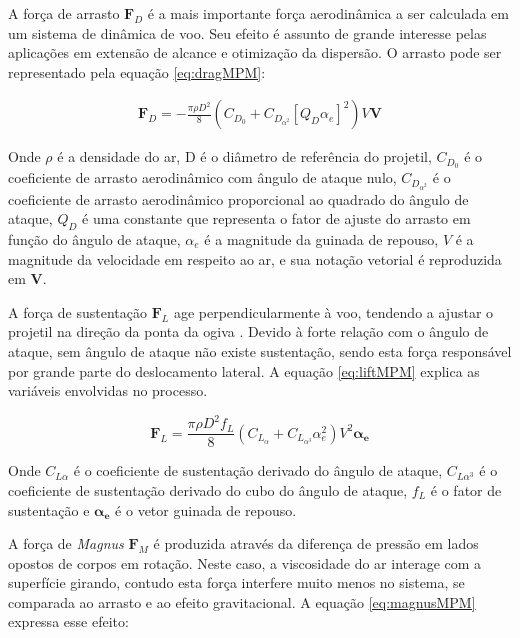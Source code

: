A força de arrasto $\boldsymbol{F}_{D}$ é a mais importante força aerodinâmica a ser calculada em um sistema de dinâmica de voo. Seu efeito é assunto de grande interesse pelas aplicações em extensão de alcance e otimização da dispersão. O arrasto pode ser representado pela equação \ref{eq:dragMPM}:

\begin{gather}
    \label{eq:dragMPM}
    \boldsymbol{F}_{D} = -\frac{\pi \rho D^{2}}{8} (C_{D_{0}} + C_{D_{\alpha^{2}}} [Q_{D}\alpha_{e}]^{2})V\boldsymbol{V}
\end{gather}

Onde $\rho$ é a densidade do ar, D é o diâmetro de referência do projetil, $C_{D_{0}}$ é o coeficiente de arrasto aerodinâmico com ângulo de ataque nulo, $C_{D_{\alpha^{2}}}$ é o coeficiente de arrasto aerodinâmico proporcional ao quadrado do ângulo de ataque, $Q_{D}$ é uma constante que representa o fator de ajuste do arrasto em função do ângulo de ataque, $\alpha_{e}$ é a magnitude da guinada de repouso, $V$ é a magnitude da velocidade em respeito ao ar, e sua notação vetorial é reproduzida em $\boldsymbol{V}$.

A força de sustentação $\boldsymbol{F}_{L}$ age perpendicularmente à voo, tendendo a ajustar o projetil na direção da ponta da ogiva \cite{McCoy2012}. Devido à forte relação com o ângulo de ataque, sem ângulo de ataque não existe sustentação, sendo esta força responsável por grande parte do deslocamento lateral. A equação \ref{eq:liftMPM} explica as variáveis envolvidas no processo.

\begin{equation}
    \label{eq:liftMPM}
    \boldsymbol{F}_{L} = \frac{\pi \rho D^{2} f_{L}}{8} (C_{L_{\alpha}}+C_{L_{\alpha^3}}\alpha_{e}^{2})V^{2} \boldsymbol{\alpha_{e}}
\end{equation}

Onde $C_{L\alpha}$ é o coeficiente de sustentação derivado do ângulo de ataque, $C_{L\alpha^{3}}$ é o coeficiente de sustentação derivado do cubo do ângulo de ataque, $f_{L}$ é o fator de sustentação e $\boldsymbol{\alpha_{e}}$ é o vetor guinada de repouso.

A força de \textit{Magnus} $\boldsymbol{F}_{M}$ é produzida através da diferença de pressão em lados opostos de corpos em rotação. Neste caso, a viscosidade do ar interage com a superfície girando, contudo esta força interfere muito menos no sistema, se comparada ao arrasto e ao efeito gravitacional. A equação \ref{eq:magnusMPM} expressa esse efeito: 

